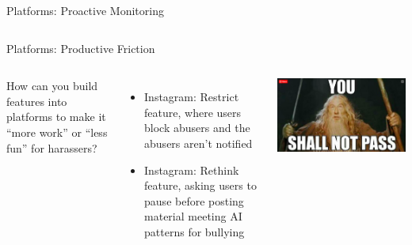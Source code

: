 \documentclass[nobackground,dvipsnames,table,aspectratio=169]{beamer}
\begin{document}
\begin{frame}{Platforms: Proactive Monitoring}
\begin{columns}
    \end{columns}
\end{frame}

\begin{frame}{Platforms: Productive Friction}
    \begin{columns}
            \small
            How can you build features into platforms to make it “more work” or “less fun” for harassers?
            \begin{itemize}
                \item Instagram: Restrict feature, where users block abusers and the abusers aren’t notified
                \item Instagram: Rethink feature, asking users to pause before posting material meeting AI patterns for bullying
            \end{itemize}
            \includegraphics[width=\textwidth]{you-shall-not-pass}
    \end{columns}
\end{frame}
\end{document}
